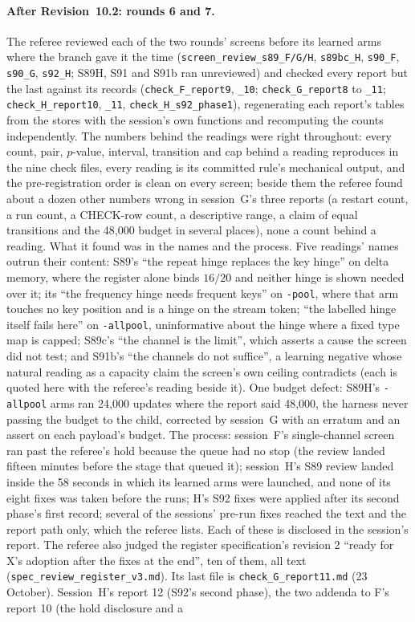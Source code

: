 \documentclass[11pt]{article}
\begin{document}
\paragraph{After Revision~10.2: rounds 6 and 7.} The referee reviewed each of the two rounds' screens before its learned arms where the branch gave it the time (\texttt{screen\_review\_s89\_F/G/H}, \texttt{s89bc\_H}, \texttt{s90\_F}, \texttt{s90\_G}, \texttt{s92\_H}; S89H, S91 and S91b ran unreviewed) and checked every report but the last against its records (\texttt{check\_F\_report9}, \texttt{\_10}; \texttt{check\_G\_report8} to \texttt{\_11}; \texttt{check\_H\_report10}, \texttt{\_11}, \texttt{check\_H\_s92\_phase1}), regenerating each report's tables from the stores with the session's own functions and recomputing the counts independently. The numbers behind the readings were right throughout: every count, pair, $p$-value, interval, transition and cap behind a reading reproduces in the nine check files, every reading is its committed rule's mechanical output, and the pre-registration order is clean on every screen; beside them the referee found about a dozen other numbers wrong in session~G's three reports (a restart count, a run count, a CHECK-row count, a descriptive range, a claim of equal transitions and the 48{,}000 budget in several places), none a count behind a reading. What it found was in the names and the process. Five readings' names outrun their content: S89's ``the repeat hinge replaces the key hinge'' on delta memory, where the register alone binds $16/20$ and neither hinge is shown needed over it; its ``the frequency hinge needs frequent keys'' on \texttt{-pool}, where that arm touches no key position and is a hinge on the stream token; ``the labelled hinge itself fails here'' on \texttt{-allpool}, uninformative about the hinge where a fixed type map is capped; S89c's ``the channel is the limit'', which asserts a cause the screen did not test; and S91b's ``the channels do not suffice'', a learning negative whose natural reading as a capacity claim the screen's own ceiling contradicts (each is quoted here with the referee's reading beside it). One budget defect: S89H's \texttt{-allpool} arms ran 24{,}000 updates where the report said 48{,}000, the harness never passing the budget to the child, corrected by session~G with an erratum and an assert on each payload's budget. The process: session~F's single-channel screen ran past the referee's hold because the queue had no stop (the review landed fifteen minutes before the stage that queued it); session~H's S89 review landed inside the 58 seconds in which its learned arms were launched, and none of its eight fixes was taken before the runs; H's S92 fixes were applied after its second phase's first record; several of the sessions' pre-run fixes reached the text and the report path only, which the referee lists. Each of these is disclosed in the session's report. The referee also judged the register specification's revision 2 ``ready for X's adoption after the fixes at the end'', ten of them, all text (\texttt{spec\_review\_register\_v3.md}). Its last file is \texttt{check\_G\_report11.md} (23 October). Session~H's report 12 (S92's second phase), the two addenda to F's report 10 (the hold disclosure and a 
\end{document}
